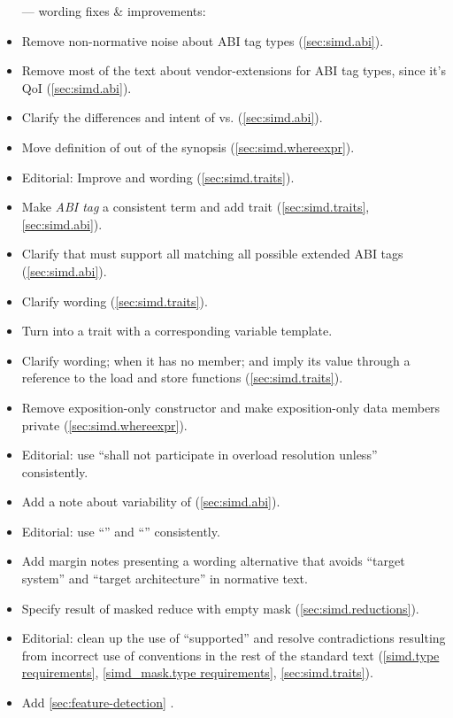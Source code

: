 \begin{itemize}
  \item[---] wording fixes \& improvements:
  \item Remove non-normative noise about ABI tag types (\ref{sec:simd.abi}).
  \item Remove most of the text about vendor-extensions for ABI tag types, since it's QoI (\ref{sec:simd.abi}).
  \item Clarify the differences and intent of  vs.  (\ref{sec:simd.abi}).
  \item Move definition of \whereexpression out of the synopsis (\ref{sec:simd.whereexpr}).
  \item Editorial: Improve  and  wording (\ref{sec:simd.traits}).
  \item Make \emph{ABI tag} a consistent term and add  trait (\ref{sec:simd.traits}, \ref{sec:simd.abi}).
  \item Clarify that \fixedsizeN must support all  matching all possible extended ABI tags (\ref{sec:simd.abi}).
  \item Clarify  wording (\ref{sec:simd.traits}).
  \item Turn  into a trait with a corresponding  variable template.
  \item Clarify  wording; when it has no  member; and imply its value through a reference to the load and store functions (\ref{sec:simd.traits}).
  \item Remove exposition-only  constructor and make exposition-only data members private (\ref{sec:simd.whereexpr}).
  \item Editorial: use “shall not participate in overload resolution unless” consistently.
  \item Add a note about variability of  (\ref{sec:simd.abi}).
  \item Editorial: use “\targetArch{}” and “\currentTarget{}” consistently.
  \item Add margin notes presenting a wording alternative that avoids “target system” and “target architecture” in normative text.
  \item Specify result of masked reduce with empty mask (\ref{sec:simd.reductions}).
  \item Editorial: clean up the use of “supported” and resolve contradictions resulting from incorrect use of conventions in the rest of the standard text (\ref{simd.type requirements}, \ref{simd_mask.type requirements}, \ref{sec:simd.traits}).
  \item Add \autoref{sec:feature-detection} .
\end{itemize}

